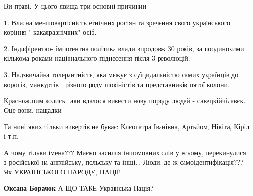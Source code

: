 \begin{itemize}
Ви праві. У цього явища три основні причинии- 

1. Власна меншовартісність етнічних росіян та зречення свого українського
коріння " какаяразнічних" осіб.

2. Індифірентно- імпотентна політика влади впродовж 30 років, за поодинокими
кількома роками національного піднесення після 3 революцій. 

3. Надзвичайна толерантність, яка межує з суїцидальністю самих українців до
ворогів, манкуртів , різного роду шовіністів та представників пятої колони.


 
Краснож.пим колись таки вдалося вивести нову породу людей - савецкійчілавєк. Оце вони, нащадки

 
Та нині яких тільки вивертів не буває: Клєопатра Іванівна, Артьйом, Нікіта, Кіріл і т.п.

 

А чому тільки імена??? Маємо засилля іншомовних слів у всьому, перекинулися з
російської на англійську, польську та інші... Люди, де ж самоідентифікація??? Як
УКРАЇНСЬКОГО НАРОДУ, НАЦІЇ!

\begin{itemize}
 
\textbf{Оксана Борачок} А ЩО ТАКЕ Українська Нація?
\end{itemize}

 


\end{itemize}
